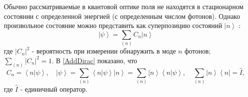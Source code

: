 Обычно рассматриваемые в квантовой оптике поля не находятся в
стационарном состоянии с определенной энергией (с определенным числом
фотонов). Однако произвольное состояние можно представить как
суперпозицию состояний $\left|n\right>$ : 
\begin{equation}
\left|\psi\right> = \sum_{(n)} C_n \left|n\right>
\end{equation}
где $\left|C_n\right|^2$ - вероятность при измерении обнаружить в моде
$n$ фотонов; $\sum_{(n)} \left|C_n\right|^2 = 1$. 
В \autoref{AddDirac} показано, что
\[
C_n = \left< n \right.\left| \psi \right>, \quad
\left| \psi \right> = \sum_{(n)} \left< n \right.\left| \psi \right>
\left| n \right> =
\sum_{(n)} \left| n \right>\left< n \right.\left| \psi \right>,
\quad
\sum_{(n)} \left| n \right>\left< n \right| = \hat{I},
\]
где $\hat{I}$ - единичный оператор.

